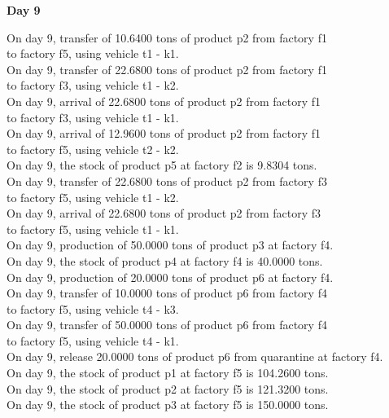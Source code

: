 \begin{table}[H]
\begin{multicols}{2}
\begin{tabbing}
\end{tabbing} \vspace{-2.0em}
\textbf{Day 9}
\vspace{-1.6em}
\begin{tabbing}
On day 9, transfer of 10.6400 tons of product p2 from factory f1 \\ to factory f5, using vehicle t1 - k1. \\
On day 9, transfer of 22.6800 tons of product p2 from factory f1 \\ to factory f3, using vehicle t1 - k2. \\
On day 9, arrival of 22.6800 tons of product p2 from factory f1 \\ to factory f3, using vehicle t1 - k1. \\
On day 9, arrival of 12.9600 tons of product p2 from factory f1 \\ to factory f5, using vehicle t2 - k2. \\
On day 9, the stock of product p5 at factory f2 is 9.8304 tons. \\
On day 9, transfer of 22.6800 tons of product p2 from factory f3 \\ to factory f5, using vehicle t1 - k2. \\
On day 9, arrival of 22.6800 tons of product p2 from factory f3 \\ to factory f5, using vehicle t1 - k1. \\
On day 9, production of 50.0000 tons of product p3 at factory f4. \\
On day 9, the stock of product p4 at factory f4 is 40.0000 tons. \\
On day 9, production of 20.0000 tons of product p6 at factory f4. \\
On day 9, transfer of 10.0000 tons of product p6 from factory f4 \\ to factory f5, using vehicle t4 - k3. \\
On day 9, transfer of 50.0000 tons of product p6 from factory f4 \\ to factory f5, using vehicle t4 - k1. \\
On day 9, release 20.0000 tons of product p6 from quarantine at factory f4. \\
On day 9, the stock of product p1 at factory f5 is 104.2600 tons. \\
On day 9, the stock of product p2 at factory f5 is 121.3200 tons. \\
On day 9, the stock of product p3 at factory f5 is 150.0000 tons. \\

\end{tabbing}
\end{multicols}
\end{table}
